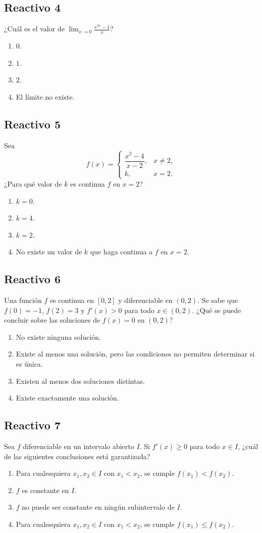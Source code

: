 \documentclass[11pt,a4paper]{article}
\newenvironment{alternativas}{%
  \begin{enumerate}\renewcommand{\labelenumi}{\Alph{enumi})}%
  \setlength{\itemsep}{3pt}\setlength{\parskip}{0pt}%
}{\end{enumerate}}
\newcommand{\reactivo}[2]{\subsection*{Reactivo #1}\noindent #2\par}
\begin{document}
\reactivo{4}{¿Cuál es el valor de
$\displaystyle\lim_{x\to 0}\frac{e^{2x}-1}{x}$?}
\begin{alternativas}
  \item $0$.
  \item $1$.
  \item $2$.
  \item El límite no existe.
\end{alternativas}

\reactivo{5}{Sea
\[
f(x)=\begin{cases}
\dfrac{x^2-4}{x-2},&x\neq 2,\\
k,&x=2.
\end{cases}
\]
¿Para qué valor de $k$ es continua $f$ en $x=2$?}
\begin{alternativas}
  \item $k=0$.
  \item $k=4$.
  \item $k=2$.
  \item No existe un valor de $k$ que haga continua a $f$ en $x=2$.
\end{alternativas}

\reactivo{6}{Una función $f$ es continua en $[0,2]$ y diferenciable en $(0,2)$.
Se sabe que $f(0)=-1$, $f(2)=3$ y $f'(x)>0$ para todo $x\in(0,2)$.
¿Qué se puede concluir sobre las soluciones de $f(x)=0$ en $(0,2)$?}
\begin{alternativas}
\item No existe ninguna solución.
    \item Existe al menos una solución, pero las condiciones
    no permiten determinar si es única.
    \item Existen al menos dos soluciones distintas.
    \item Existe exactamente una solución.
\end{alternativas}

\reactivo{7}{Sea $f$ diferenciable en un intervalo abierto $I$. Si $f'(x)\geq0$
para todo $x\in I$, ¿cuál de las siguientes conclusiones está garantizada?}
\begin{alternativas}
\item Para cualesquiera $x_1,x_2\in I$ con $x_1<x_2$,
    se cumple $f(x_1)<f(x_2)$.
    \item $f$ es constante en $I$.
    \item $f$ no puede ser constante en ningún subintervalo de $I$.
    \item Para cualesquiera $x_1,x_2\in I$ con $x_1<x_2$,
    se cumple $f(x_1)\leq f(x_2)$.
\end{alternativas}
\end{document}
